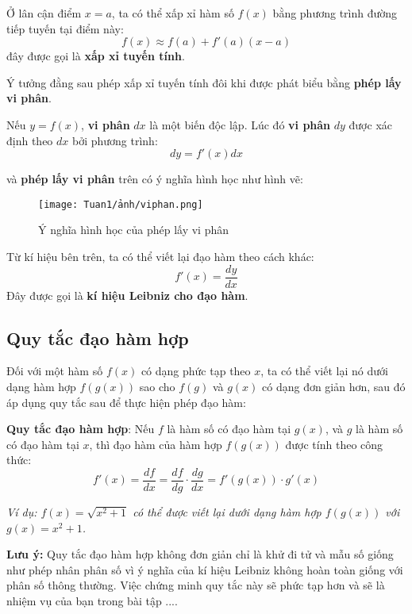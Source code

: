 \begin{definition}
    Ở lân cận điểm $x=a$, ta có thể xấp xỉ hàm số $f(x)$ bằng phương trình đường tiếp tuyến tại điểm này:
\begin{equation}
        f(x)\approx f(a)+f'(a)(x-a)
    \end{equation}
đây được gọi là \textbf{xấp xỉ tuyến tính}.
\end{definition}
Ý tưởng đằng sau phép xấp xỉ tuyến tính đôi khi được phát biểu bằng \textbf{phép lấy vi phân}.

\begin{definition}
    Nếu $y=f(x)$, \textbf{vi phân} $dx$ là một biến độc lập. Lúc đó \textbf{vi phân} $dy$ được xác định theo $dx$ bởi phương trình:
\begin{equation}
    dy=f'(x)dx
\end{equation}
\end{definition}
và \textbf{phép lấy vi phân} trên có ý nghĩa hình học như hình vẽ:

\begin{figure}[H]
\centering
\texttt{[image: Tuan1/ảnh/viphan.png]}
\caption{Ý nghĩa hình học của phép lấy vi phân}
\end{figure}
Từ kí hiệu bên trên, ta có thể viết lại đạo hàm theo cách khác:
\begin{equation}
    f'(x)=\frac{dy}{dx} 
\end{equation}
Đây được gọi là \textbf{kí hiệu Leibniz cho đạo hàm}.
\subsection{Quy tắc đạo hàm hợp}

Đối với một hàm số \(f(x)\) có dạng phức tạp theo \(x\), ta có thể viết lại nó dưới dạng hàm hợp \(f(g(x))\) sao cho \(f(g)\) và \(g(x)\) có dạng đơn giản hơn, sau đó áp dụng quy tắc sau để thực hiện phép đạo hàm:
\begin{theorem}
\textbf{Quy tắc đạo hàm hợp}: Nếu \(f\) là hàm số có đạo hàm tại \(g(x)\), và \(g\) là hàm số có đạo hàm tại \(x\), thì đạo hàm của hàm hợp \(f(g(x))\) được tính theo công thức:
\begin{equation}
    f'(x)=\frac{df}{dx}=\frac{df}{dg}\cdot\frac{dg}{dx}=f'(g(x))\cdot g'(x)
\end{equation}
\end{theorem}
\textit{Ví dụ: \(f(x)=\sqrt{x^2+1}\) có thể được viết lại dưới dạng hàm hợp \(f(g(x))\) với \(g(x)=x^2+1\).}

\textbf{Lưu ý:} Quy tắc đạo hàm hợp không đơn giản chỉ là khử đi tử và mẫu số giống như phép nhân phân số vì ý nghĩa của kí hiệu Leibniz không hoàn toàn giống với phân số thông thường. Việc chứng minh quy tắc này sẽ phức tạp hơn và sẽ là nhiệm vụ của bạn trong bài tập ....

